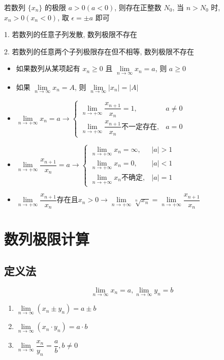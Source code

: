 \begin{property}[保号性]
	若数列 $\{x_{n}\}$ 的极限 $a>0(a<0)$, 则存在正整数 $N_{0}$, 当 $n>N_{0}$ 时, $x_{n}>0(x_{n}<0)$, 取 $\epsilon = \pm a$ 即可
\end{property}
\begin{anymark}[注]
	1. 若数列的任意子列发散, 数列极限不存在

	2. 若数列的任意两个子列极限存在但不相等, 数列极限不存在
\end{anymark}
\begin{corollary}[数列极限]
	\begin{itemize}
		\item 如果数列从某项起有 $x_{n}\geq 0$ 且 $\lim\limits_{n\to\infty}x_{n} = a$, 则 $a\geq 0$
		\item 如果 $\lim\limits_{n\to\infty} x_{n} = A$, 则 $\lim\limits_{n\to\infty} |x_{n}| = |A|$
		\item $\lim\limits_{n\rightarrow +\infty}x_{n}=a\to \begin{cases} \lim\limits_{n\rightarrow +\infty}\dfrac{x_{n+1}}{x_{n}}=1, & a\neq 0\\ \lim\limits_{n\rightarrow +\infty}\dfrac{x_{n+1}}{x_{n}} \text{不一定存在}, & a=0  \end{cases}$
		\item $\lim\limits_{n\rightarrow +\infty}\dfrac{x_{n+1}}{x_{n}}=a\to \begin{cases} \lim\limits_{n\rightarrow +\infty}x_{n}=\infty,& |a|>1  \\ \lim\limits_{n\rightarrow +\infty}x_{n}=0,&|a|<1\\  \lim\limits_{n\rightarrow +\infty}x_{n}\text{不确定},&|a|=1 \end{cases}$
		\item $\lim\limits_{n\rightarrow +\infty}\dfrac{x_{n+1}}{x_{n}}\text{存在且}x_{n}>0\to \lim\limits_{n\rightarrow +\infty}\sqrt[n]{x_{n}}=\lim\limits_{n\rightarrow +\infty}\dfrac{x_{n+1}}{x_{n}}$
	\end{itemize}
\end{corollary}

\section{数列极限计算}
\subsection{定义法}
\begin{definition}[极限的四则运算]
	$$\lim\limits_{n\to \infty}x_{n}=a,\lim\limits_{n\to \infty}y_{n}=b$$
	\begin{enumerate}
		\item $\lim\limits_{n\to \infty}(x_{n}\pm y_{n}) = a\pm b$
		\item $\lim\limits_{n\to \infty}(x_{n}\cdot y_{n}) = a\cdot b$
		\item $\lim\limits_{n\to \infty}\dfrac{x_{n}}{y_{n}} = \dfrac{a}{b}, b\neq 0$
	\end{enumerate}

\end{definition}
